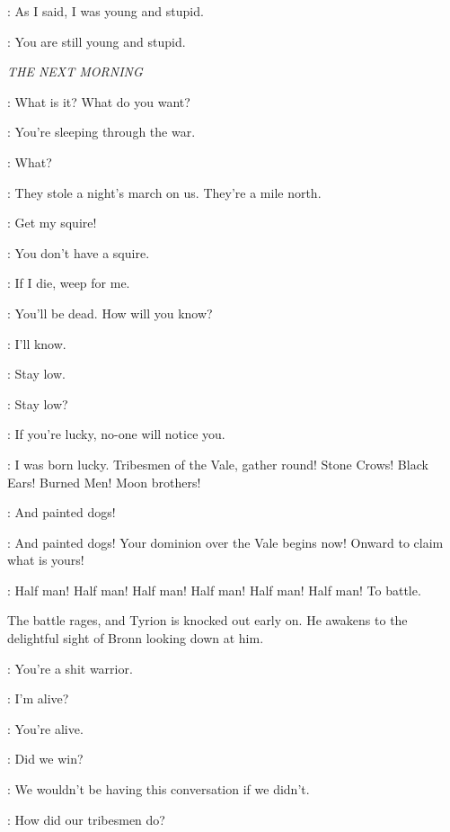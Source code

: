 \TYRION: As I said, I was young and stupid. 

\SHAE: You are still young and stupid. 


\scene

\textit{THE NEXT MORNING} 


\TYRION: What is it? What do you want? 

\BRONN: You're sleeping through the war. 

\TYRION: What? 

\BRONN: They stole a night's march on us. They're a mile north. 

\TYRION: Get my squire! 

\BRONN: You don't have a squire. 

\TYRION: If I die, weep for me. 

\SHAE: You'll be dead. How will you know? 

\TYRION: I'll know. 


\BRONN: Stay low. 

\TYRION: Stay low? 

\BRONN: If you're lucky, no-one will notice you. 

\TYRION: I was born lucky. Tribesmen of the Vale, gather round! Stone Crows! Black Ears! Burned Men! Moon brothers! 

\HILLTRIBESMAN: And painted dogs! 

\TYRION: And painted dogs! Your dominion over the Vale begins now! Onward to claim what is yours! 

\CROWD: Half man! Half man! Half man! Half man! Half man! Half man! To battle. 


\n The battle rages, and Tyrion is knocked out early on.  He awakens to the delightful sight of Bronn looking down at him.

\BRONN: You're a shit warrior. 

\TYRION: I'm alive? 

\BRONN: You're alive. 

\TYRION: Did we win? 

\BRONN: We wouldn't be having this conversation if we didn't. 

\TYRION: How did our tribesmen do? 

